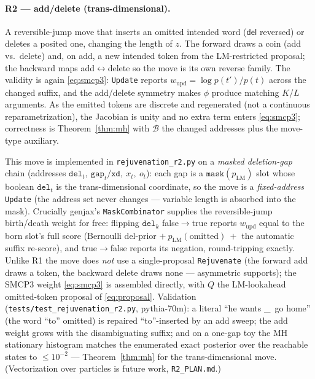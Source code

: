 \documentclass[11pt]{article}
\newcommand{\delact}{\textsf{del}}
\newcommand{\pLM}{p_{\mathrm{LM}}}
\newcommand{\code}[1]{\texttt{#1}}
\begin{document}
\paragraph{R2 — add/delete (trans-dimensional).} A reversible-jump move that inserts an omitted
intended word ($\delact$ reversed) or deletes a posited one, changing the length of $z$. The forward
draws a coin (add vs.\ delete) and, on add, a new intended token from the LM-restricted proposal; the
backward maps add$\leftrightarrow$delete so the move is its own reverse family. The validity is again
\eqref{eq:smcp3}: \code{Update} reports $w_{\mathrm{upd}} = \log p(t')/p(t)$ across the changed
suffix, and the add/delete symmetry makes $\phi$ produce matching $K$/$L$ arguments. As the emitted
tokens are discrete and regenerated (not a continuous reparametrization), the Jacobian is unity and no
extra term enters \eqref{eq:smcp3}; correctness is Theorem~\ref{thm:mh} with $\mathcal B$ the changed
addresses plus the move-type auxiliary.

This move is implemented in \code{rejuvenation\_r2.py} on a \emph{masked deletion-gap} chain
(addresses $\code{del}_t,\ \code{gap}_t/\code{xd},\ x_t,\ o_t$): each gap is a
$\code{mask}(\pLM)$ slot whose boolean $\code{del}_t$ is the trans-dimensional coordinate, so the
move is a \emph{fixed-address} \code{Update} (the address set never changes — variable length is
absorbed into the mask). Crucially genjax's \code{MaskCombinator} supplies the reversible-jump
birth/death weight for free: flipping $\code{del}_k$ \textsf{false}$\to$\textsf{true} reports
$w_{\mathrm{upd}}$ equal to the born slot's full score (Bernoulli del-prior $+\ \pLM(\text{omitted})\ +$
the automatic suffix re-score), and \textsf{true}$\to$\textsf{false} reports its negation, round-tripping
exactly. Unlike R1 the move does \emph{not} use a single-proposal \code{Rejuvenate} (the forward add
draws a token, the backward delete draws none — asymmetric supports); the SMCP3 weight
\eqref{eq:smcp3} is assembled directly, with $Q$ the LM-lookahead omitted-token proposal of
\eqref{eq:proposal}. Validation (\code{tests/test\_rejuvenation\_r2.py}, pythia-70m): a literal
``he wants \_\ go home'' (the word ``to'' omitted) is repaired ``to''-inserted by an add sweep;
the add weight grows with the disambiguating suffix; and on a one-gap toy the MH stationary histogram
matches the enumerated exact posterior over the reachable states to $\le 10^{-2}$ — Theorem~\ref{thm:mh}
for the trans-dimensional move. (Vectorization over particles is future work, \code{R2\_PLAN.md}.)
\end{document}

